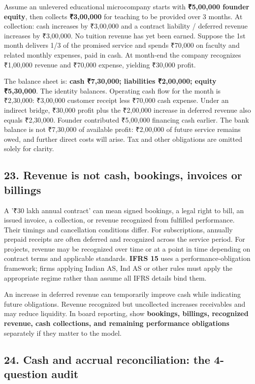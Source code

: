 Assume an unlevered educational microcompany starts with \textbf{₹5,00,000 founder equity}, then collects \textbf{₹3,00,000} for teaching to be provided over 3 months. At collection: cash increases by ₹3,00,000 and a contract liability / deferred revenue increases by ₹3,00,000. No tuition revenue has yet been earned. Suppose the 1st month delivers 1/3 of the promised service and spends ₹70,000 on faculty and related monthly expenses, paid in cash. At month-end the company recognizes ₹1,00,000 revenue and ₹70,000 expense, yielding ₹30,000 profit.

The balance sheet is: \textbf{cash ₹7,30,000; liabilities ₹2,00,000; equity ₹5,30,000}. The identity balances. Operating cash flow for the month is ₹2,30,000: ₹3,00,000 customer receipt less ₹70,000 cash expense. Under an indirect bridge, ₹30,000 profit plus the ₹2,00,000 increase in deferred revenue also equals ₹2,30,000. Founder contributed ₹5,00,000 financing cash earlier. The bank balance is not ₹7,30,000 of available profit: ₹2,00,000 of future service remains owed, and further direct costs will arise. Tax and other obligations are omitted solely for clarity.

\subsection{23. Revenue is not cash, bookings, invoices or billings}


A '₹30 lakh annual contract' can mean signed bookings, a legal right to bill, an issued invoice, a collection, or revenue recognized from fulfilled performance. Their timings and cancellation conditions differ. For subscriptions, annually prepaid receipts are often deferred and recognized across the service period. For projects, revenue may be recognized over time or at a point in time depending on contract terms and applicable standards. \textbf{IFRS 15} uses a performance-obligation framework; firms applying Indian AS, Ind AS or other rules must apply the appropriate regime rather than assume all IFRS details bind them.

An increase in deferred revenue can temporarily improve cash while indicating future obligations. Revenue recognized but uncollected increases receivables and may reduce liquidity. In board reporting, show \textbf{bookings, billings, recognized revenue, cash collections, and remaining performance obligations} separately if they matter to the model.

\subsection{24. Cash and accrual reconciliation: the 4-question audit}


